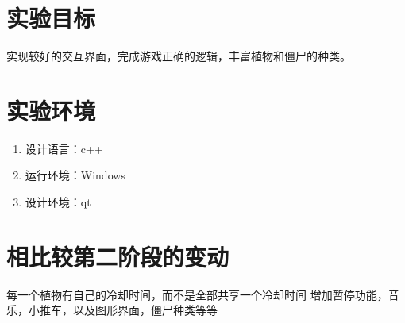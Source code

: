 \documentclass[12pt,a4paper,UTF8]{article}
\begin{document}
\section{实验目标}
    实现较好的交互界面，完成游戏正确的逻辑，丰富植物和僵尸的种类。

\section{实验环境}
\begin{enumerate}
  \item 设计语言：c++
  \item 运行环境：Windows
  \item 设计环境：qt
\end{enumerate}
  
\section{相比较第二阶段的变动}
每一个植物有自己的冷却时间，而不是全部共享一个冷却时间
增加暂停功能，音乐，小推车，以及图形界面，僵尸种类等等
\end{document}

